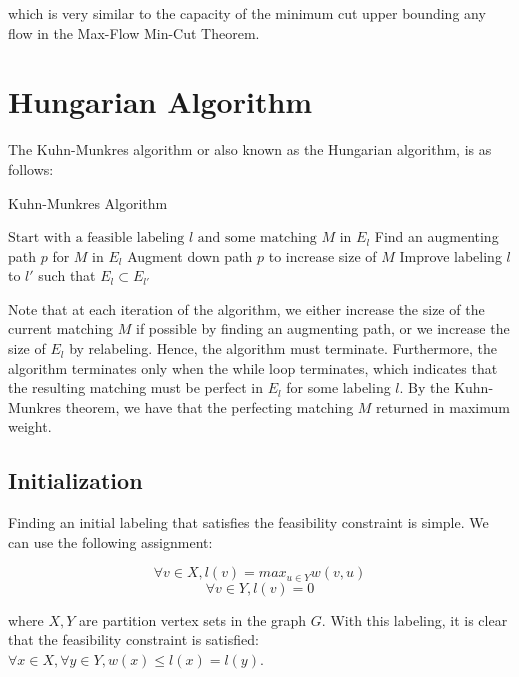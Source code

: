 \documentclass{article}
\begin{document}
which is very similar to the capacity of the minimum cut upper bounding any flow in the Max-Flow Min-Cut Theorem.

\section{Hungarian Algorithm}

The Kuhn-Munkres algorithm or also known as the Hungarian algorithm, is as follows:

\begin{algorithm}
\caption{Kuhn-Munkres Algorithm}\label{euclid}
\begin{algorithmic}[1]
\State $\text{Start with a feasible labeling $l$ and some matching $M$ in $E_l$}$
\State Find an augmenting path $p$ for $M$ in $E_l$ 
\State Augment down path $p$ to increase size of $M$
\Else
\State Improve labeling $l$ to $l'$ such that $E_l \subset E_{l'}$
\EndIf
\EndWhile
\end{algorithmic}
\end{algorithm}

Note that at each iteration of the algorithm, we either increase the size of the current matching $M$ if possible by finding an augmenting path, or we increase the size of $E_l$ by relabeling. Hence, the algorithm must terminate. Furthermore, the algorithm terminates only when the while loop terminates, which indicates that the resulting matching must be perfect in $E_l$ for some labeling $l$. By the Kuhn-Munkres theorem, we have that the perfecting matching $M$ returned in maximum weight.

\subsection{Initialization}

Finding an initial labeling that satisfies the feasibility constraint is simple. We can use the following assignment:

\begin{equation*}
\forall v \in X, l(v) = max_{u \in Y} w(v, u)
\end{equation*}
\begin{equation*}
\forall v \in Y, l(v) = 0 
\end{equation*}

where $X, Y$ are partition vertex sets in the graph $G$. With this labeling, it is clear that the feasibility constraint is satisfied: $\forall x \in X, \forall y \in Y, w(x) \leq l(x) = l(y)$.
\end{document}
